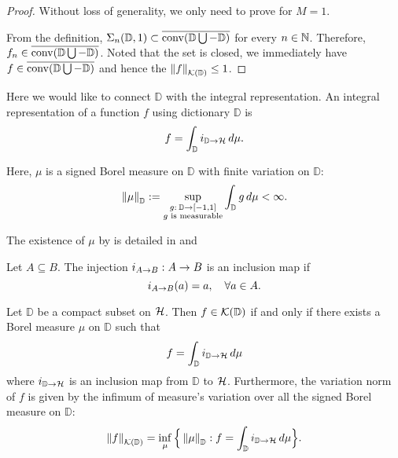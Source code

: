 \begin{proof}
    Without loss of generality, we only need to prove for $M = 1$.

    From the definition, $\Sigma_n(\mathbb{D}, 1) \subset
    \overline{\operatorname*{conv}({\mathbb{D}} \bigcup -{\mathbb{D}})}$ for every $n \in \mathbb{N}$. Therefore, $f_n \in
    \overline{\operatorname*{conv}({\mathbb{D}} \bigcup -{\mathbb{D}})}$. Noted that the set is closed, we immediately
    have $f \in \overline{\operatorname*{conv}({\mathbb{D}} \bigcup -{\mathbb{D}})}$ and hence the
    $\left\| {f} \right\|_{\mathcal{K}({\mathbb{D}})} \leq 1$.
\end{proof}


Here we would like to connect $\mathbb{D}$ with the integral representation. An
integral representation of a function $f$ using dictionary $\mathbb{D}$ is
\begin{equation}
    f = \int_{\mathbb{D}} i_{{\mathbb{D}}\to{\mathcal{H}}} \,d\mu.
\end{equation}

Here, $\mu$ is a signed Borel measure on $\mathbb{D}$ with finite variation on $\mathbb{D}$:
\begin{equation}
    \label{eq:measure_set_variation}
    \left\| \mu \right\|_{\mathbb{D}} := \sup_{\substack{
            g: \:\mathbb{D} \to [-1, 1] \\ g \textnormal{ is measurable}
        }
    } \int_{\mathbb{D}} g\,d\mu < \infty.
\end{equation}

\begin{remark}
    The existence of $\mu$ by is detailed in \cite[Proposition
    2]{siegelCharacterizationVariationSpaces2022} and \citep[Chapter
    4]{diestelSequencesSeriesBanach1984}
\end{remark}

\begin{definition}
    \label{def:inclusionMap}
    Let $A \subseteq B$. The injection $i_{{A}\to{B}}: A\to B$ is an
    inclusion map if
    \begin{equation}
        i_{{A}\to{B}}(a) = a, \quad \forall a \in A.
    \end{equation}
\end{definition}

\begin{lemma}
    \label{lemma:compact_set_integral_representation}
    Let $\mathbb{D}$ be a compact subset on $\mathcal{H}$. Then $f \in
    \mathcal{K}({\mathbb{D}})$ if and only if there exists a Borel measure $\mu$ on
    $\mathbb{D}$ such that
    \begin{equation}
        f = \int_{\mathbb{D}} i_{{\mathbb{D}}\to{\mathcal{H}}} \,d\mu
    \end{equation}
    where $i_{{\mathbb{D}}\to{\mathcal{H}}}$ is an inclusion map from
    $\mathbb{D}$ to $\mathcal{H}$. Furthermore, the variation norm of $f$ is given
    by the infimum of measure's variation over all the signed Borel measure on
    $\mathbb{D}$:
    \begin{equation}
        \left\| {f} \right\|_{\mathcal{K}({\mathbb{D}})} = \inf_{\mu}\Big\{
            \left\| \mu \right\|_{\mathbb{D}}: 
            f = \int_{\mathbb{D}} i_{{\mathbb{D}}\to{\mathcal{H}}} \,d\mu
        \Big\}.
    \end{equation}
\end{lemma}


